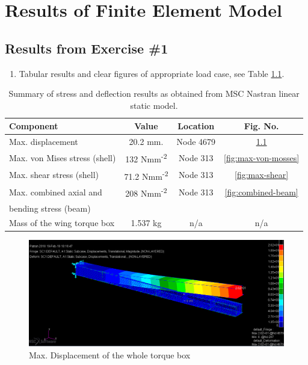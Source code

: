 \documentclass[11pt,a4paper,oneside]{memoir}
\begin{document}
\chapter{Results of Finite Element Model}\label{chap:results}
\section{Results from Exercise \#1}
\begin{enumerate}
	\item Tabular results and clear figures of appropriate load case, see Table \ref{tab:summary-results}.
\end{enumerate}

\begin{table}[h]
\centering
\caption{Summary of stress and deflection results as obtained from MSC Nastran linear static model.}
\label{tab:summary-results}
\begin{tabular}{lccc}
  \toprule
  Component                           & Value & Location & Fig. No.   \\
  \midrule
  Max. displacement                   &  20.2 mm. &     Node 4679     &     \ref{fig:max-displacement}       \\
  \midrule
  Max. von Mises stress (shell)       &  132 Nmm\textsuperscript{-2}& Node 313  &    \ref{fig:max-von-mosses}        \\
  \midrule
  Max. shear stress (shell)           &  71.2 Nmm\textsuperscript{-2} & Node 313 &   \ref{fig:max-shear}        \\
  \midrule
  Max. combined axial and             &  208 Nmm\textsuperscript{-2} & Node 313 &   \ref{fig:combined-beam}         \\
  bending stress (beam)               &       &          &            \\
  \midrule
  Mass of the wing torque box         &  1.537 kg &    n/a   &   n/a      \\  \bottomrule
\end{tabular}\end{table}
\begin{figure}[h]
    \centering
    \includegraphics[width = .8\textwidth]{figures/one-displacement-2.png}
    \caption{Max. Displacement of the whole torque box}
    \label{fig:max-displacement}
\end{figure}
\end{document}
